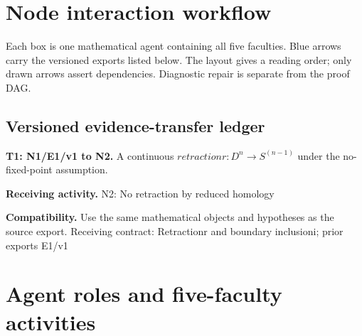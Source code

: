 \documentclass[preprint,12pt,aps,pra,showkeys,amsmath,amssymb,superscriptaddress,floatfix]{revtex4-2}
\theoremstyle{definition}
\theoremstyle{remark}
\newcommand{\field}[2]{\par\smallskip\noindent\textbf{#1.} #2\par}
\begin{document}
\clearpage\section{Node interaction workflow}

\begin{center}\end{center}

Each box is one mathematical agent containing all five faculties. Blue
arrows carry the versioned exports listed below. The layout gives a
reading order; only drawn arrows assert dependencies. Diagnostic repair
is separate from the proof DAG.

\subsection{Versioned evidence-transfer ledger}

\begingroup\small\linespread{1.05}\selectfont

\field{T1: N1/E1/v1 to N2}{A continuous \(retractionr:D^{n}\to S^{(n-1)}\) under the no-fixed-point
assumption.}

\field{Receiving activity}{N2: No retraction by reduced homology}

\field{Compatibility}{Use the same mathematical objects and hypotheses as the source export.
Receiving contract: Retractionr and boundary inclusioni; prior exports
E1/v1}

\endgroup

\clearpage\section{Agent roles and five-faculty activities}\begingroup\small\linespread{1.05}\selectfont{}
\end{document}
